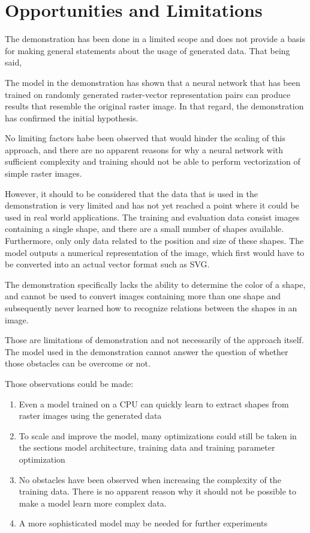 \documentclass[12pt, a4paper, titlepage]{report}
\begin{document}
\section{Opportunities and Limitations}

The demonstration has been done in a limited scope and does not provide a basis for making general statements about the usage of generated data. That being said, 

The model in the demonstration has shown that a neural network that has been trained on randomly generated raster-vector representation pairs can produce results that resemble the original raster image. In that regard, the demonstration has confirmed the initial hypothesis.

No limiting factors habe been observed that would hinder the scaling of this approach, and there are no apparent reasons for why a neural network with sufficient complexity and training should not be able to perform vectorization of simple raster images.


However, it should to be considered that the data that is used in the demonstration is very limited and has not yet reached a point where it could be used in real world applications. The training and evaluation data consist images containing a single shape, and there are a small number of shapes available. Furthermore, only only data related to the position and size of these shapes. The model outputs a numerical representation of the image, which first would have to be converted into an actual vector format such as SVG.

The demonstration specifically lacks the ability to determine the color of a shape, and cannot be used to convert images containing more than one shape and subsequently never learned how to recognize relations between the shapes in an image.

\vspace{0.5cm}
Those are limitations of demonstration and not necessarily of the approach itself. The model used in the demonstration cannot answer the question of whether those obstacles can be overcome or not.

Those observations could be made:

\begin{enumerate}[label=\Roman*.]
   \item Even a model trained on a CPU can quickly learn to extract shapes from raster images using the generated data
   \item To scale and improve the model, many optimizations could still be taken in the sections model architecture, training data and training parameter optimization
   \item No obstacles have been observed when increasing the complexity of the training data. There is no apparent reason why it should not be possible to make a model learn more complex data.
   \item A more sophisticated model may be needed for further experiments
\end{enumerate}
\end{document}
